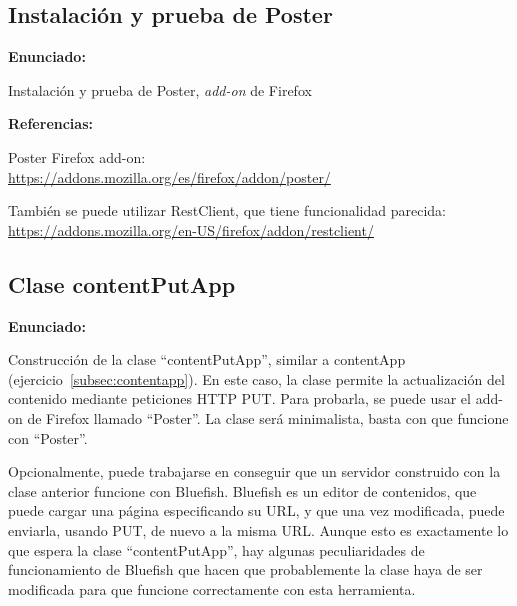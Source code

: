 
\subsection{Instalación y prueba de Poster}
\label{subsec:inst-poster}

\textbf{Enunciado:}

Instalación y prueba de Poster, \emph{add-on} de Firefox

\textbf{Referencias:}

Poster Firefox add-on: \\
\url{https://addons.mozilla.org/es/firefox/addon/poster/}

También se puede utilizar RestClient, que tiene funcionalidad parecida: \\
\url{https://addons.mozilla.org/en-US/firefox/addon/restclient/}

\subsection{Clase contentPutApp}
\label{subsec:contentputapp}

\textbf{Enunciado:}

Construcción de la clase ``contentPutApp'', similar a contentApp (ejercicio~\ref{subsec:contentapp}). En este caso, la clase permite la actualización del contenido mediante peticiones HTTP PUT. Para probarla, se puede usar el add-on de Firefox llamado ``Poster''. La clase será minimalista, basta con que funcione con ``Poster''.

Opcionalmente, puede trabajarse en conseguir que un servidor construido con la clase anterior funcione con Bluefish. Bluefish es un editor de contenidos, que puede cargar una página especificando su URL, y que una vez modificada, puede enviarla, usando PUT, de nuevo a la misma URL. Aunque esto es exactamente lo que espera la clase ``contentPutApp'', hay algunas peculiaridades de funcionamiento de Bluefish que hacen que probablemente la clase haya de ser modificada para que funcione correctamente con esta herramienta.

